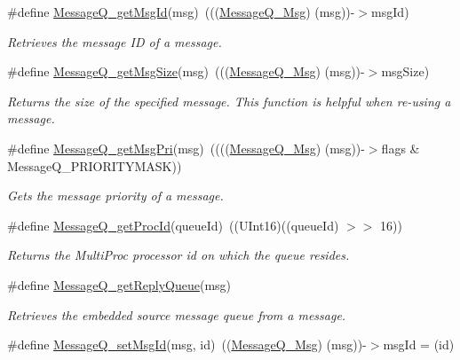 \begin{DoxyCompactItemize}
\#define \hyperlink{_message_q_8h_a12f1040474ebdb289f08205ecb30fd18}{MessageQ\_\-getMsgId}(msg)~(((\hyperlink{struct_message_q___msg_header}{MessageQ\_\-Msg}) (msg))-\/$>$msgId)
\begin{DoxyCompactList}\small\item\em Retrieves the message ID of a message. \item\end{DoxyCompactList}\item 
\#define \hyperlink{_message_q_8h_a8e3e82ba789ac47279fd35a4cf76d786}{MessageQ\_\-getMsgSize}(msg)~(((\hyperlink{struct_message_q___msg_header}{MessageQ\_\-Msg}) (msg))-\/$>$msgSize)
\begin{DoxyCompactList}\small\item\em Returns the size of the specified message. This function is helpful when re-\/using a message. \item\end{DoxyCompactList}\item 
\#define \hyperlink{_message_q_8h_ad5fc8c9c78eaa4d37d26c8b371b82765}{MessageQ\_\-getMsgPri}(msg)~((((\hyperlink{struct_message_q___msg_header}{MessageQ\_\-Msg}) (msg))-\/$>$flags \& MessageQ\_\-PRIORITYMASK))
\begin{DoxyCompactList}\small\item\em Gets the message priority of a message. \item\end{DoxyCompactList}\item 
\#define \hyperlink{_message_q_8h_a108ddf7170cf6f9fde0bb991768c33d0}{MessageQ\_\-getProcId}(queueId)~((UInt16)((queueId) $>$$>$ 16))
\begin{DoxyCompactList}\small\item\em Returns the MultiProc processor id on which the queue resides. \item\end{DoxyCompactList}\item 
\#define \hyperlink{_message_q_8h_a8af7731e0ea02352febe0f055438c5e5}{MessageQ\_\-getReplyQueue}(msg)
\begin{DoxyCompactList}\small\item\em Retrieves the embedded source message queue from a message. \item\end{DoxyCompactList}\item 
\#define \hyperlink{_message_q_8h_a1aa25d3081a17945aecf1b4c23cef49c}{MessageQ\_\-setMsgId}(msg, id)~((\hyperlink{struct_message_q___msg_header}{MessageQ\_\-Msg}) (msg))-\/$>$msgId = (id)
$$
\end{DoxyCompactItemize}
